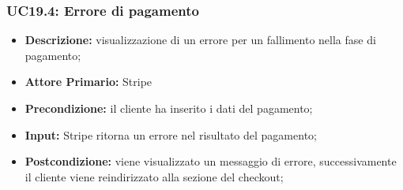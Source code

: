 \subsubsection{UC19.4: Errore di pagamento}
\label{sec:UC19.4}
\begin{itemize}
    \item \textbf{Descrizione:} visualizzazione di un errore per un fallimento nella fase di pagamento;
    \item \textbf{Attore Primario:} Stripe
    \item \textbf{Precondizione:} il cliente ha inserito i dati del pagamento;
    \item \textbf{Input:} Stripe ritorna un errore nel risultato del pagamento;
    \item \textbf{Postcondizione:} viene visualizzato un messaggio di errore, successivamente il cliente viene reindirizzato alla sezione del checkout;
\end{itemize}
